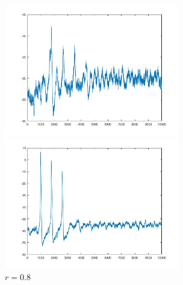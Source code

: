 \documentclass[
pdflinks,
]{xjtuthesis}
\begin{document}
\begin{figure}[!ht]
\begin{minipage}[!ht]{0.5\linewidth}
\centering
\includegraphics[width=3.0in]{figures/p10r0_5_2.jpg}
\caption{$r=0.5$}
\end{minipage}%
\begin{minipage}[!ht]{0.5\linewidth}
\centering
\includegraphics[width=3.0in]{figures/p10r0_8_2.jpg}
\caption{$r=0.8$}
\end{minipage}
\end{figure}
\end{document}
